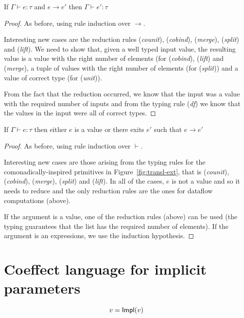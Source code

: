 \begin{theorem}
  If $\Gamma \vdash e : \tau$ and $e \rightarrow e'$ then $\Gamma \vdash e' : \tau$
\end{theorem}
\begin{proof}
As before, using rule induction over $\rightarrow$.

Interesting new cases are the reduction rules (\emph{counit}), (\emph{cobind}), (\emph{merge}),
(\emph{split}) and (\emph{lift}). We need to show that, given a well typed input value, the resulting
value is a  value with the right number of elements (for (\emph{cobind}), (\emph{lift}) and (\emph{merge}),
a tuple of  values with the right number of elements (for (\emph{split})) and a value
of correct type (for (\emph{unit})).

From the fact that the reduction occurred, we know that the input was a  value with the
required number of inputs and from the typing rule (\emph{df}) we know that the values in the input
were all of correct types.  
\end{proof}

\begin{theorem}[Progress]
  If $\Gamma \vdash e : \tau$ then either $e$ is a value or there exits $e'$ such that $e \rightarrow e'$
\end{theorem}
\begin{proof}
  As before, using rule induction over $\vdash$.

Interesting new cases are those arising from the typing rules for the comonadically-inspired
primitives in Figure~\ref{fig:transl-ext}, that is (\emph{counit}), (\emph{cobind}), (\emph{merge}),
(\emph{split}) and (\emph{lift}).  
In all of the cases, $e$ is not a value and so it needs to reduce and the only reduction rules
are the ones for dataflow computations (above). 

If the argument is a value, one of the reduction rules (above) can be used (the typing guarantees
that the list has the required number of elements). If the argument is an expressions, we use 
the induction hypothesis.
\end{proof}

\newpage
\section{Coeffect language for implicit parameters}

\begin{equation*}
v = \ident{Impl}(v)
\end{equation*}

